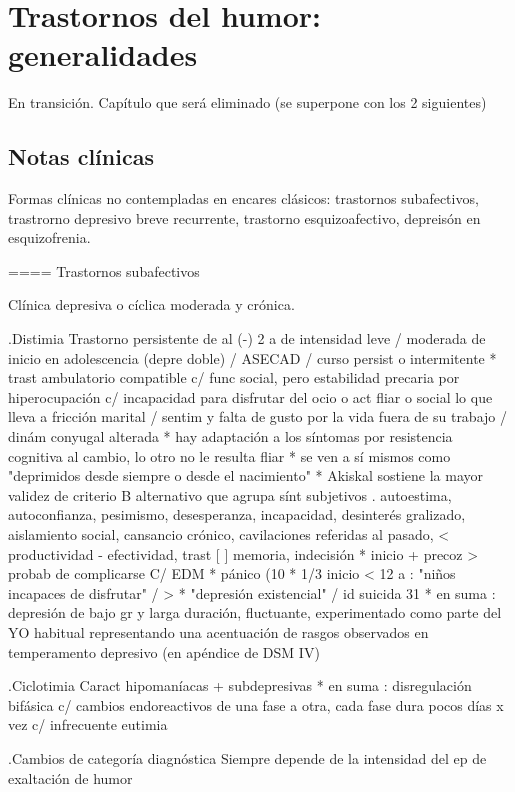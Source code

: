 \chapter{Trastornos del humor: generalidades}
\faStopCircle En transición. Capítulo que será eliminado (se superpone con los 2 siguientes)
\section*{Notas clínicas}
Formas clínicas no contempladas en encares clásicos: trastornos subafectivos, trastrorno depresivo breve recurrente, trastorno esquizoafectivo, depreisón en esquizofrenia.

==== Trastornos subafectivos

Clínica depresiva o cíclica moderada y crónica.

.Distimia
Trastorno persistente de al (-) 2 a de intensidad leve / moderada de inicio en adolescencia (depre doble) / ASECAD / curso persist o intermitente
* trast ambulatorio compatible c/ func social, pero estabilidad precaria por hiperocupación c/ incapacidad para disfrutar del ocio o act fliar o social lo que lleva a fricción marital / sentim y falta de gusto por la vida fuera de su trabajo / dinám conyugal alterada
* hay adaptación a los síntomas por resistencia cognitiva al cambio, lo otro no le resulta fliar
* se ven a sí mismos como "deprimidos desde siempre o desde el nacimiento"
* Akiskal sostiene la mayor validez de criterio B alternativo que agrupa sínt subjetivos . autoestima, autoconfianza, pesimismo, desesperanza, incapacidad, desinterés gralizado, aislamiento social, cansancio crónico, cavilaciones referidas al pasado, < productividad - efectividad, trast [ ] memoria, indecisión
* inicio + precoz > probab de complicarse C/ EDM
* pánico (10 %
* 1/3 inicio < 12 a : "niños incapaces de disfrutar" / > %
* "depresión existencial" / id suicida 31 %
* en suma : depresión de bajo gr y larga duración, fluctuante, experimentado como parte del YO habitual representando una acentuación de rasgos observados en temperamento depresivo (en apéndice de DSM IV)

.Ciclotimia
Caract hipomaníacas + subdepresivas
* en suma : disregulación bifásica c/ cambios endoreactivos de una fase a otra, cada fase dura pocos días x vez c/ infrecuente eutimia

.Cambios de categoría diagnóstica
Siempre depende de la intensidad del ep de exaltación de humor

